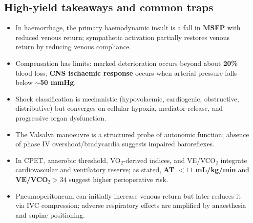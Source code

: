\documentclass[11pt,a4paper]{article}
\begin{document}
\subsection{High-yield takeaways and common traps}
\begin{itemize}
\item In haemorrhage, the primary haemodynamic insult is a fall in \textbf{MSFP} with reduced venous return; sympathetic activation partially restores venous return by reducing venous compliance.
\item Compensation has limits: marked deterioration occurs beyond about \textbf{20\%} blood loss; \textbf{CNS ischaemic response} occurs when arterial pressure falls below \textbf{$\sim$50 mmHg}.
\item Shock classification is mechanistic (hypovolaemic, cardiogenic, obstructive, distributive) but converges on cellular hypoxia, mediator release, and progressive organ dysfunction.
\item The Valsalva manoeuvre is a structured probe of autonomic function; absence of phase IV overshoot/bradycardia suggests impaired baroreflexes.
\item In CPET, anaerobic threshold, VO$_2$-derived indices, and VE/VCO$_2$ integrate cardiovascular and ventilatory reserve; as stated, \textbf{AT $<11$ mL/kg/min} and \textbf{VE/VCO$_2 >34$} suggest higher perioperative risk.
\item Pneumoperitoneum can initially increase venous return but later reduces it via IVC compression; adverse respiratory effects are amplified by anaesthesia and supine positioning.
\end{itemize}
\end{document}
